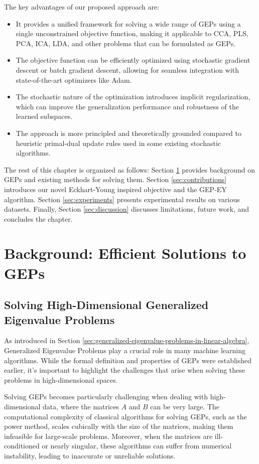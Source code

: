 The key advantages of our proposed approach are:
\begin{itemize}
    \item It provides a unified framework for solving a wide range of GEPs using a single unconstrained objective function, making it applicable to CCA, PLS, PCA, ICA, LDA, and other problems that can be formulated as GEPs.
    \item The objective function can be efficiently optimized using stochastic gradient descent or batch gradient descent, allowing for seamless integration with state-of-the-art optimizers like Adam.
    \item The stochastic nature of the optimization introduces implicit regularization, which can improve the generalization performance and robustness of the learned subspaces.
    \item The approach is more principled and theoretically grounded compared to heuristic primal-dual update rules used in some existing stochastic algorithms.
\end{itemize}

The rest of this chapter is organized as follows: Section \ref{sec:background-unified} provides background on GEPs and existing methods for solving them. Section \ref{sec:contributions} introduces our novel Eckhart-Young inspired objective and the GEP-EY algorithm. Section \ref{sec:experiments} presents experimental results on various datasets. Finally, Section \ref{sec:discussion} discusses limitations, future work, and concludes the chapter.

\section{Background: Efficient Solutions to GEPs}\label{sec:background-unified}
\subsection{Solving High-Dimensional Generalized Eigenvalue Problems}

As introduced in Section \ref{sec:generalized-eigenvalue-problems-in-linear-algebra}, Generalized Eigenvalue Problems play a crucial role in many machine learning algorithms. While the formal definition and properties of GEPs were established earlier, it's important to highlight the challenges that arise when solving these problems in high-dimensional spaces.

Solving GEPs becomes particularly challenging when dealing with high-dimensional data, where the matrices $A$ and $B$ can be very large. The computational complexity of classical algorithms for solving GEPs, such as the power method, scales cubically with the size of the matrices, making them infeasible for large-scale problems. Moreover, when the matrices are ill-conditioned or nearly singular, these algorithms can suffer from numerical instability, leading to inaccurate or unreliable solutions.

